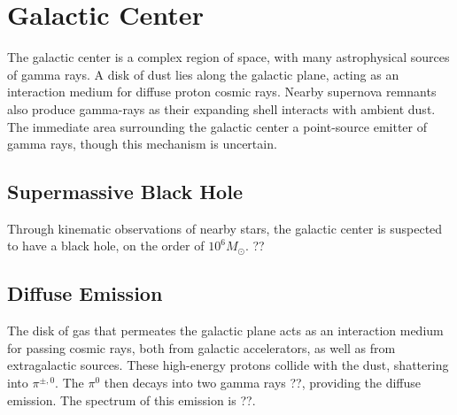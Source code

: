 \section{Galactic Center}

The galactic center is a complex region of space, with many astrophysical sources of gamma rays.
A disk of dust lies along the galactic plane, acting as an interaction medium for diffuse proton cosmic rays.
Nearby supernova remnants also produce gamma-rays as their expanding shell interacts with ambient dust.
The immediate area surrounding the galactic center a point-source emitter of gamma rays, though this mechanism is uncertain.

\subsection{Supermassive Black Hole}

Through kinematic observations of nearby stars, the galactic center is suspected to have a black hole, on the order of $10^6 M_{\odot}$. ??

\subsection{Diffuse Emission}
The disk of gas that permeates the galactic plane acts as an interaction medium for passing cosmic rays, both from galactic accelerators, as well as from extragalactic sources.
These high-energy protons collide with the dust, shattering into $\pi^{\pm,0}$.
The $\pi^0$ then decays into two gamma rays ??, providing the diffuse emission.
The spectrum of this emission is ??.



